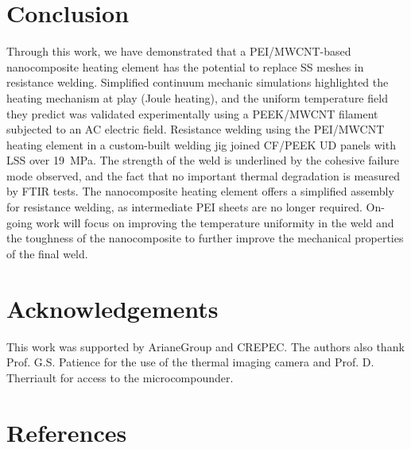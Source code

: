 \documentclass[11pt,review,times]{elsarticle}
\begin{document}
\FloatBarrier

							\section{Conclusion}

Through this work, we have demonstrated that a PEI/MWCNT-based nanocomposite heating element has the potential to replace SS meshes in resistance welding. 
Simplified continuum mechanic simulations highlighted the heating mechanism at play (Joule heating), and the uniform temperature field they predict was validated experimentally using a PEEK/MWCNT filament subjected to an AC electric field. 
Resistance welding using the PEI/MWCNT heating element in a custom-built welding jig joined CF/PEEK UD panels with LSS over \SI{19}{\MPa}. 
The strength of the weld is underlined by the cohesive failure mode observed, and the fact that no important thermal degradation is measured by FTIR tests. 
The nanocomposite heating element offers a simplified assembly for resistance welding, as intermediate PEI sheets are no longer required. 
On-going work will focus on improving the temperature uniformity in the weld and the toughness of the nanocomposite to further improve the mechanical properties of the final weld.

							\section{Acknowledgements}

This work was supported by ArianeGroup and CREPEC. 
The authors also thank Prof. G.S. Patience for the use of the thermal imaging camera and Prof. D. Therriault for access to the microcompounder. 

							\section*{References}




\end{document}

